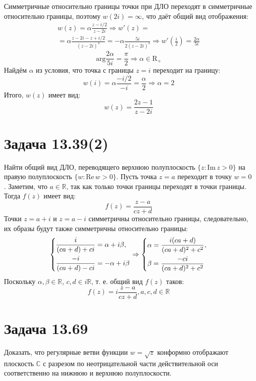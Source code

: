 \documentclass[11pt]{article}
\begin{document}
Симметричные относительно границы точки при ДЛО переходят в симметричные относительно границы, поэтому \(w(2i) = \infty\),
что даёт общий вид отображения:
\begin{multline*}
w(z) = \alpha\frac{z - i/2}{z - 2i} \Rightarrow w'(z) = \\
= \alpha\frac{z - 2i - z + i/2}{(z - 2i)^2} = -\alpha\frac{5i}{2(z - 2i)^2} \Rightarrow w'\left(\frac{i}2\right) = \frac{2\alpha}{5i}
\end{multline*}
$$\mathrm{arg}\frac{2\alpha}{5i} = \frac{\pi}2 \Rightarrow \alpha \in \mathrm{R}_+$$
Найдём \(\alpha\) из условия, что точка с границы \(z = i\) переходит на границу:
$$w(i) = \alpha\frac{-i/2}{-i} = \frac{\alpha}2 \Rightarrow \alpha = 2$$
Итого, \(w(z)\) имеет вид:
$$w(z) = \frac{2z - 1}{z - 2i}$$
\section{Задача 13.39(2)}
\label{sec:org33010fb}
Найти общий вид ДЛО, переводящего верхнюю полуплоскость \(\{z: \mathrm{Im}\,z > 0\}\) на правую полуплоскость
\(\{w: \mathrm{Re}\,w > 0\}\).
Пусть точка \(z = a\) переходит в точку \(w = 0\). Заметим, что \(a \in \mathbb{R}\), так как только точки границы
переходят в точки границы. Тогда \(f(z)\) имеет вид:
$$f(z) = \frac{z - a}{cz + d}$$
Точки \(z = a + i\) и \(z = a - i\) симметричны относительно границы, следовательно, их образы будут также симметричны
относительно границы:
\begin{multline*}
\begin{dcases}
\frac{i}{(ca + d) + ci} = \alpha + i\beta, \\
\frac{-i}{(ca + d) - ci} = -\alpha + i\beta
\end{dcases}
\Rightarrow
\begin{dcases}
\alpha = \frac{i(ca +d)}{(ca + d)^2 + c^2}, \\
\beta = \frac{-ci}{(ca + d)^2 + c^2}
\end{dcases}
\end{multline*}
Поскольку \(\alpha, \beta \in \mathbb{R}\), \(c, d \in i\mathbb{R}\), т. е. общий вид \(f(z)\) таков:
$$f(z) = i\frac{z - a}{cz + d}, a, c, d \in \mathbb{R}$$
\section{Задача 13.69}
\label{sec:orgd3561b5}
Доказать, что регулярные ветви функции \(w = \sqrt z\) конформно отображают плоскость \(\mathbb{C}\) с разрезом по
неотрицательной части действительной оси соответственно на нижнюю и верхнюю полуплоскости.
\end{document}
